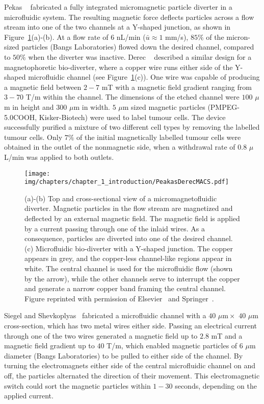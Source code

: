 Pekas \etal{}~\cite{Pekas2005} fabricated a fully integrated micromagnetic particle diverter in a microfluidic system. The resulting magnetic force deflects particles across a flow stream into one of the two channels at a Y-shaped junction, as shown in Figure~\ref{fig:wireIntegratedMagnetophoresis}(a)-(b). At a flow rate of $6$ nL/min ($\bar{u}\approx 1$ mm/s), $85\%$ of the micron-sized particles (Bangs Laboratories) flowed down the desired channel, compared to $50\%$ when the diverter was inactive. Derec \etal{}~\cite{Derec2010} described a similar design for a magnetophoretic bio-diverter, where a copper wire runs either side of the Y-shaped microfluidic channel (see Figure~\ref{fig:wireIntegratedMagnetophoresis}(c)). One wire was capable of producing a magnetic field between $2-7$ mT with a magnetic field gradient ranging from $3-70$ T/m within the channel. The dimensions of the etched channel were $100$ $\mu$m in height and $300$ $\mu$m in width. $5$ $\mu$m sized magnetic particles (PMPEG-5.0COOH, Kisker-Biotech) were used to label tumour cells. The device successfully purified a mixture of two different cell types by removing the labelled tumour cells. Only $7\%$ of the initial magnetically labelled tumour cells were obtained in the outlet of the nonmagnetic side, when a withdrawal rate of $0.8$ $\mu$L/min was applied to both outlets. 

\begin{figure}[htb]
        \centering
		\texttt{[image: img/chapters/chapter\_1\_introduction/PeakasDerecMACS.pdf]}
        \caption[Integrated magnetophoretic particle diverter in microfluidic systems]{(a)-(b) Top and cross-sectional view of a micromagnetofluidic diverter. Magnetic particles in the flow stream are magnetized and deflected by an external magnetic field. The magnetic field is applied by a current passing through one of the inlaid wires. As a consequence, particles are diverted into one of the desired channel. (c) Microfluidic bio-diverter with a Y-shaped junction. The copper appears in grey, and the copper-less channel-like regions appear in white. The central channel is used for the microfluidic flow (shown by the arrow), while the other channels serve to interrupt the copper and generate a narrow copper band framing the central channel. Figure reprinted with permission of Elsevier~\cite{Pekas2005} and Springer~\cite{Derec2010}.}
        \label{fig:wireIntegratedMagnetophoresis}
\end{figure}

Siegel and Shevkoplyas~\cite{Siegel2006,Shevkoplyas2007} fabricated a microfluidic channel with a $40$ $\mu\textrm{m}\times$ $40$ $\mu\textrm{m}$ cross-section, which has two metal wires either side. Passing an electrical current through one of the two wires generated a magnetic field up to $2.8$ mT and a magnetic field gradient up to $40$ T/m, which enabled magnetic particles of $6$ $\mu$m diameter (Bangs Laboratories) to be pulled to either side of the channel. By turning the electromagnets either side of the central microfluidic channel on and off, the particles alternated the direction of their movement. This electromagnetic switch could sort the magnetic particles within $1-30$ seconds, depending on the applied current. 

